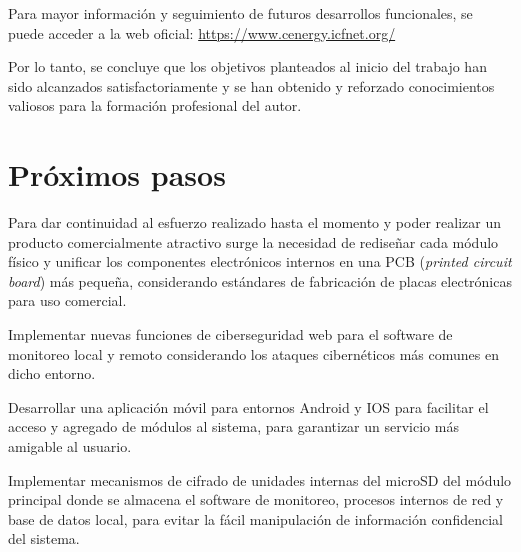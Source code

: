 Para mayor información y seguimiento de futuros desarrollos funcionales, se puede acceder a la web oficial: \url{https://www.cenergy.icfnet.org/}

Por lo tanto, se concluye que los objetivos planteados al inicio del trabajo han sido alcanzados satisfactoriamente y se han obtenido y reforzado conocimientos valiosos para la formación profesional del autor.


\section{Próximos pasos}

Para dar continuidad al esfuerzo realizado hasta el momento y poder realizar un producto comercialmente atractivo surge la necesidad de rediseñar cada módulo físico y unificar los componentes electrónicos internos en una PCB (\emph{printed circuit board}) más pequeña, considerando estándares de fabricación de placas electrónicas para uso comercial.

Implementar nuevas funciones de ciberseguridad web para el software de monitoreo local y remoto considerando los ataques cibernéticos más comunes en dicho entorno.

Desarrollar una aplicación móvil para entornos Android y IOS para facilitar el acceso y agregado de módulos al sistema, para garantizar un servicio más amigable al usuario.

Implementar mecanismos de cifrado de unidades internas del microSD del módulo principal donde se almacena el software de monitoreo, procesos internos de red y base de datos local, para evitar la fácil manipulación de información confidencial del sistema.

